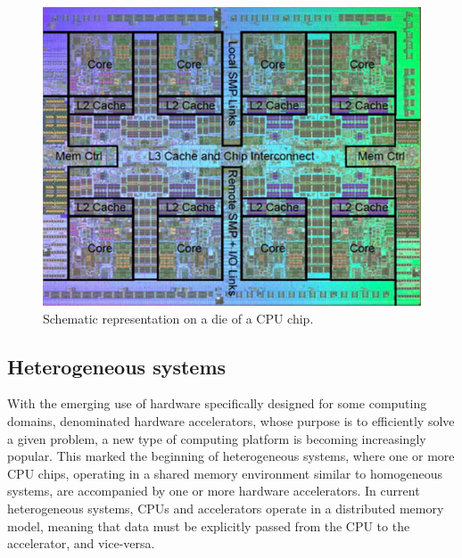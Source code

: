\begin{figure}[!htp]
	\begin{center}
		\includegraphics[scale=4]{../../common/img/cpu_scheme.jpg}
		\caption{Schematic representation on a die of a CPU chip.}
		\label{fig:CPUChip}
	\end{center}
\end{figure}

\subsection{Heterogeneous systems}
\label{HeterogeneousSystems}

With the emerging use of hardware specifically designed for some computing domains, denominated hardware accelerators, whose purpose is to efficiently solve a given problem, a new type of computing platform is becoming increasingly popular. This marked the beginning of heterogeneous systems, where one or more CPU chips, operating in a shared memory environment similar to homogeneous systems, are accompanied by one or more hardware accelerators. In current heterogeneous systems, CPUs and accelerators operate in a distributed memory model, meaning that data must be explicitly passed from the CPU to the accelerator, and vice-versa.

